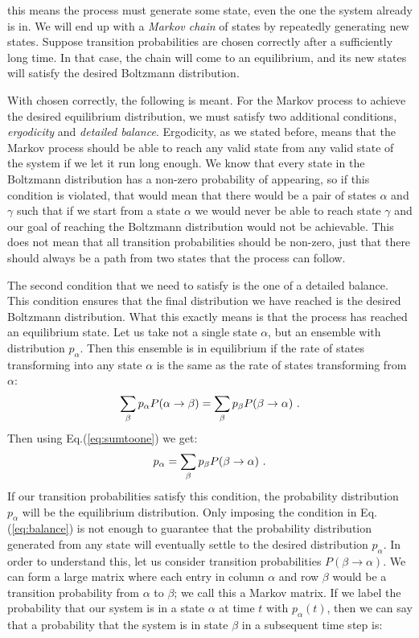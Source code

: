 this means the process must generate some state, even the one the system already is in. We will end up with a \textit{Markov chain} of states by repeatedly generating new states. Suppose transition probabilities are chosen correctly after a sufficiently long time. In that case, the chain will come to an equilibrium, and its new states will satisfy the desired Boltzmann distribution.
\par
With chosen correctly, the following is meant. For the Markov process to achieve the desired equilibrium distribution, we must satisfy two additional conditions, \textit{ergodicity} and \textit{detailed balance}. Ergodicity, as we stated before, means that the Markov process should be able to reach any valid state from any valid state of the system if we let it run long enough. We know that every state in the Boltzmann distribution has a non-zero probability of appearing, so if this condition is violated, that would mean that there would be a pair of states $\alpha$ and $\gamma$ such that if we start from a state $\alpha$ we would never be able to reach state $\gamma$ and our goal of reaching the Boltzmann distribution would not be achievable. This does not mean that all transition probabilities should be non-zero, just that there should always be a path from two states that the process can follow.
\par
The second condition that we need to satisfy is the one of a detailed balance. This condition ensures that the final distribution we have reached is the desired Boltzmann distribution. What this exactly means is that the process has reached an equilibrium state. Let us take not a single state $\alpha$, but an ensemble with distribution $p_\alpha$. Then this ensemble is in equilibrium if the rate of states transforming into any state $\alpha$ is the same as the rate of states transforming from $\alpha$:
\begin{equation}
	\sum_{\beta}p_{\alpha} P(\alpha \rightarrow \beta) = \sum_{\beta}p_{\beta}P(\beta \rightarrow \alpha) \ .
	\label{eq:balance}
\end{equation}
Then using Eq.(\ref{eq:sumtoone}) we get:
\begin{equation}
	p_{\alpha} = \sum_{\beta} p_{\beta}P(\beta \rightarrow \alpha) \ .
\end{equation}
If our transition probabilities satisfy this condition, the probability distribution $p_{\alpha}$ will be the equilibrium distribution. Only imposing the condition in Eq.(\ref{eq:balance}) is not enough to guarantee that the probability distribution generated from any state will eventually settle to the desired distribution $p_\alpha$. In order to understand this, let us consider transition probabilities $P(\beta \rightarrow \alpha)$. We can form a large matrix where each entry in column $\alpha$ and row $\beta$ would be a transition probability from $\alpha$ to $\beta$; we call this a Markov matrix. If we label the probability that our system is in a state $\alpha$ at time $t$ with $p_{\alpha}(t)$, then we can say that a probability that the system is in state $\beta$ in a subsequent time step is:
